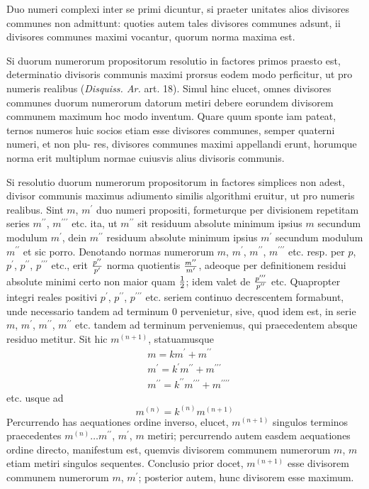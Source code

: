 \documentclass[twoside,12pt, showframe]{memoir}
\let\oldfrac\frac
\def\frac#1#2{\mathchoice{\tfrac{#1}{#2}}{\oldfrac{#1}{#2}}{\genfrac{}{}{}{2}{#1}{#2\mathstrut}}{\genfrac{}{}{}{3}{#1}{#2\mathstrut}}}
\begin{document}
Duo numeri complexi inter se primi dicuntur, si praeter unitates alios divisores communes non admittunt: quoties autem tales divisores communes adsunt, ii divisores communes maximi vocantur, quorum norma maxima est.
 
Si duorum numerorum propositorum resolutio in factores primos praesto est, determinatio divisoris communis maximi prorsus eodem modo perficitur, ut pro numeris realibus (\textit{Disquiss. Ar.} art. 18). Simul hinc elucet, omnes divisores communes duorum numerorum datorum metiri debere eorundem divisorem communem maximum hoc modo inventum. Quare quum sponte iam pateat, ternos numeros huic socios etiam esse divisores communes, semper quaterni numeri, et non plu-\clearpage\noindent%
res, divisores communes maximi appellandi erunt, horumque norma erit multiplum normae cuiusvis alius divisoris communis.

Si resolutio duorum numerorum propositorum in factores simplices non adest, divisor communis maximus adiumento similis algorithmi eruitur, ut pro numeris realibus. Sint \(m\), \({m}^{\prime}\) duo numeri propositi, formeturque per divisionem repetitam series \(m^{\prime \prime}\), \(m^{\prime \prime \prime}\) etc. ita, ut \(m^{\prime \prime}\) sit residuum absolute minimum ipsius \(m\) secundum modulum \(m^{\prime}\), dein \(m^{\prime \prime}\) residuum absolute minimum ipsius \(m^{\prime}\) secundum modulum \(m^{\prime \prime}\) et sic porro. Denotando normas numerorum \(m\), \(m^{\prime}\), \(m^{\prime \prime}\), \(m^{\prime \prime \prime}\) etc. resp. per \(p\), \(p^{\prime}\), \(p^{\prime \prime}\), \(p^{\prime \prime \prime}\) etc., erit \(\frac{p^{\prime \prime}}{p^{\prime}}\) norma quotientis \(\frac{m^{\prime \prime}}{m^{\prime}}\), adeoque per definitionem residui absolute minimi certo non maior quam \(\frac{1}{2}\); idem valet de \(\frac{p^{\prime \prime \prime}}{p^{\prime \prime}}\) etc. Quapropter integri reales positivi \(p^{\prime}\), \( p^{\prime \prime}\), \(p^{\prime \prime \prime}\) etc. seriem continuo decrescentem formabunt, unde necessario tandem ad terminum \(0\) pervenietur, sive, quod idem est, in serie \(m\), \(m^{\prime}\), \(m^{\prime \prime}\), \(m^{\prime \prime}\) etc. tandem ad terminum perveniemus, qui praecedentem absque residuo metitur. Sit hic \(m^{(n+1)}\), statuamusque
\[\begin{aligned}
& m=k m^{\prime}+m^{\prime \prime} \\
& m^{\prime}=k^{\prime} m^{\prime \prime}+m^{\prime \prime \prime} \\
& m^{\prime \prime}=k^{\prime \prime} m^{\prime \prime \prime}+m^{\prime \prime \prime \prime}
\end{aligned}\]
etc. usque ad
\[m^{(n)}=k^{(n)} m^{(n+1)}\]
Percurrendo has aequationes ordine inverso, elucet, \(m^{(n+1)}\) singulos terminos praecedentes \(m^{(n)} \ldots m^{\prime \prime}\), \(m^{\prime}\), \(m\) metiri; percurrendo autem easdem aequationes ordine directo, manifestum est, quemvis divisorem communem numerorum \(m\), \(m\) etiam metiri singulos sequentes. Conclusio prior docet, \(m^{(n+1)}\) esse divisorem communem numerorum \(m\), \(m^{\prime}\); posterior autem, hunc divisorem esse maximum.
 
\end{document}
